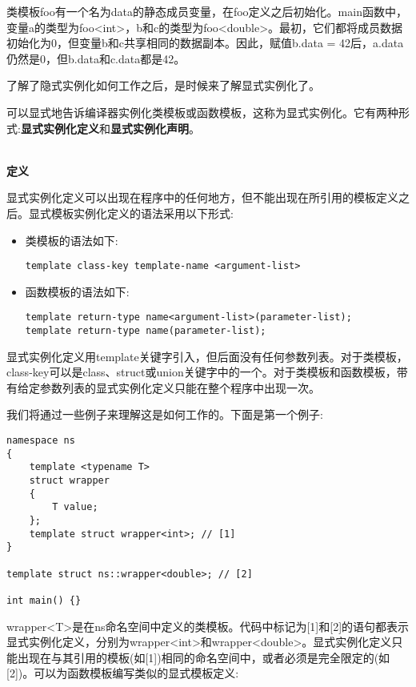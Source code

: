 类模板foo有一个名为data的静态成员变量，在foo定义之后初始化。main函数中，变量a的类型为foo<int>，b和c的类型为foo<double>。最初，它们都将成员数据初始化为0，但变量b和c共享相同的数据副本。因此，赋值b.data = 42后，a.data仍然是0，但b.data和c.data都是42。

了解了隐式实例化如何工作之后，是时候来了解显式实例化了。


可以显式地告诉编译器实例化类模板或函数模板，这称为显式实例化。它有两种形式:\textbf{显式实例化定义}和\textbf{显式实例化声明}。


\hspace*{\fill} \\ %
\noindent\textbf{定义}

显式实例化定义可以出现在程序中的任何地方，但不能出现在所引用的模板定义之后。显式模板实例化定义的语法采用以下形式:

\begin{itemize}
\item 
类模板的语法如下:
\begin{lstlisting}[style=styleCXX]
template class-key template-name <argument-list>
\end{lstlisting}

\item 
函数模板的语法如下:
\begin{lstlisting}[style=styleCXX]
template return-type name<argument-list>(parameter-list);
template return-type name(parameter-list);
\end{lstlisting}
\end{itemize}

显式实例化定义用template关键字引入，但后面没有任何参数列表。对于类模板，class-key可以是class、struct或union关键字中的一个。对于类模板和函数模板，带有给定参数列表的显式实例化定义只能在整个程序中出现一次。

我们将通过一些例子来理解这是如何工作的。下面是第一个例子:

\begin{lstlisting}[style=styleCXX]
namespace ns
{
	template <typename T>
	struct wrapper
	{
		T value;
	};
	template struct wrapper<int>; // [1]
}

template struct ns::wrapper<double>; // [2]

int main() {}
\end{lstlisting}

wrapper<T>是在ns命名空间中定义的类模板。代码中标记为[1]和[2]的语句都表示显式实例化定义，分别为wrapper<int>和wrapper<double>。显式实例化定义只能出现在与其引用的模板(如[1])相同的命名空间中，或者必须是完全限定的(如[2])。可以为函数模板编写类似的显式模板定义:


